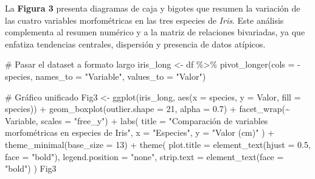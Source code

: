 \documentclass[
  spanish,
  11pt,
  a4paper,
  DIV=11,
  numbers=noendperiod]{scrartcl}
\newenvironment{Shaded}{\begin{snugshade}}{\end{snugshade}}
\newcommand{\AttributeTok}[1]{\textcolor[rgb]{0.40,0.45,0.13}{#1}}
\newcommand{\CommentTok}[1]{\textcolor[rgb]{0.37,0.37,0.37}{#1}}
\newcommand{\DecValTok}[1]{\textcolor[rgb]{0.68,0.00,0.00}{#1}}
\newcommand{\FloatTok}[1]{\textcolor[rgb]{0.68,0.00,0.00}{#1}}
\newcommand{\FunctionTok}[1]{\textcolor[rgb]{0.28,0.35,0.67}{#1}}
\newcommand{\NormalTok}[1]{\textcolor[rgb]{0.00,0.23,0.31}{#1}}
\newcommand{\OtherTok}[1]{\textcolor[rgb]{0.00,0.23,0.31}{#1}}
\newcommand{\SpecialCharTok}[1]{\textcolor[rgb]{0.37,0.37,0.37}{#1}}
\newcommand{\StringTok}[1]{\textcolor[rgb]{0.13,0.47,0.30}{#1}}
\begin{document}
La \textbf{Figura 3} presenta diagramas de caja y bigotes que resumen la
variación de las cuatro variables morfométricas en las tres especies de
\emph{Iris}. Este análisis complementa al resumen numérico y a la matriz
de relaciones bivariadas, ya que enfatiza tendencias centrales,
dispersión y presencia de datos atípicos.

\begin{Shaded}
\begin{Highlighting}[numbers=left,,]
\CommentTok{\# Pasar el dataset a formato largo}
\NormalTok{iris\_long }\OtherTok{\textless{}{-}}\NormalTok{ df }\SpecialCharTok{\%\textgreater{}\%}
  \FunctionTok{pivot\_longer}\NormalTok{(}\AttributeTok{cols =} \SpecialCharTok{{-}}\NormalTok{species,}
               \AttributeTok{names\_to =} \StringTok{"Variable"}\NormalTok{,}
               \AttributeTok{values\_to =} \StringTok{"Valor"}\NormalTok{)}

\CommentTok{\# Gráfico unificado}
\NormalTok{Fig3 }\OtherTok{\textless{}{-}} \FunctionTok{ggplot}\NormalTok{(iris\_long, }\FunctionTok{aes}\NormalTok{(}\AttributeTok{x =}\NormalTok{ species, }\AttributeTok{y =}\NormalTok{ Valor, }\AttributeTok{fill =}\NormalTok{ species)) }\SpecialCharTok{+}
  \FunctionTok{geom\_boxplot}\NormalTok{(}\AttributeTok{outlier.shape =} \DecValTok{21}\NormalTok{, }\AttributeTok{alpha =} \FloatTok{0.7}\NormalTok{) }\SpecialCharTok{+}
  \FunctionTok{facet\_wrap}\NormalTok{(}\SpecialCharTok{\textasciitilde{}}\NormalTok{ Variable, }\AttributeTok{scales =} \StringTok{"free\_y"}\NormalTok{) }\SpecialCharTok{+}
  \FunctionTok{labs}\NormalTok{(}
    \AttributeTok{title =} \StringTok{"Comparación de variables morfométricas en especies de Iris"}\NormalTok{,}
    \AttributeTok{x =} \StringTok{"Especies"}\NormalTok{,}
    \AttributeTok{y =} \StringTok{"Valor (cm)"}
\NormalTok{  ) }\SpecialCharTok{+}
  \FunctionTok{theme\_minimal}\NormalTok{(}\AttributeTok{base\_size =} \DecValTok{13}\NormalTok{) }\SpecialCharTok{+}
  \FunctionTok{theme}\NormalTok{(}
    \AttributeTok{plot.title =} \FunctionTok{element\_text}\NormalTok{(}\AttributeTok{hjust =} \FloatTok{0.5}\NormalTok{, }\AttributeTok{face =} \StringTok{"bold"}\NormalTok{),}
    \AttributeTok{legend.position =} \StringTok{"none"}\NormalTok{,}
    \AttributeTok{strip.text =} \FunctionTok{element\_text}\NormalTok{(}\AttributeTok{face =} \StringTok{"bold"}\NormalTok{)}
\NormalTok{  )}
\NormalTok{Fig3}
\end{Highlighting}
\end{Shaded}
\end{document}
